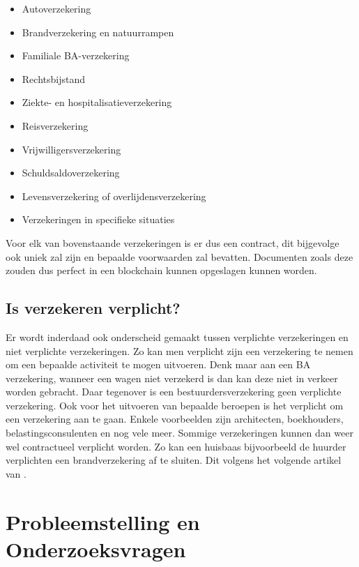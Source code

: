 \begin{itemize}
	\item Autoverzekering
	\item Brandverzekering en natuurrampen
	\item Familiale BA-verzekering
	\item Rechtsbijstand
	\item Ziekte- en hospitalisatieverzekering
	\item Reisverzekering
	\item Vrijwilligersverzekering
	\item Schuldsaldoverzekering
	\item Levensverzekering of overlijdensverzekering
	\item Verzekeringen in specifieke situaties
\end{itemize}

Voor elk van bovenstaande verzekeringen is er dus een contract, dit bijgevolge ook uniek zal zijn en bepaalde voorwaarden zal bevatten. Documenten zoals deze zouden dus perfect in een blockchain kunnen opgeslagen kunnen worden. 

\subsection{Is verzekeren verplicht?}
Er wordt inderdaad ook onderscheid gemaakt tussen verplichte verzekeringen en niet verplichte verzekeringen. Zo kan men verplicht zijn een verzekering te nemen om een bepaalde activiteit te mogen uitvoeren. Denk maar aan een BA verzekering, wanneer een wagen niet verzekerd is dan kan deze niet in verkeer worden gebracht. Daar tegenover is een bestuurdersverzekering geen verplichte verzekering. Ook voor het uitvoeren van bepaalde beroepen is het verplicht om een verzekering aan te gaan. Enkele voorbeelden zijn architecten, boekhouders, belastingsconsulenten en nog vele meer. Sommige verzekeringen kunnen dan weer wel contractueel verplicht worden. Zo kan een huisbaas bijvoorbeeld de huurder verplichten een brandverzekering af te sluiten. Dit volgens het volgende artikel van \textcite{BFOverplichteVerzekeringen}. 


\section{Probleemstelling en Onderzoeksvragen}
\label{sec:onderzoeksvragen}


